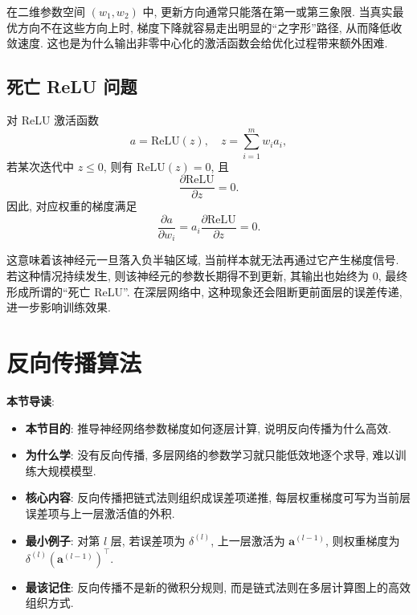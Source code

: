 \documentclass{../nndlcourse}
\begin{document}
在二维参数空间 $(w_1, w_2)$ 中, 更新方向通常只能落在第一或第三象限. 当真实最优方向不在这些方向上时, 梯度下降就容易走出明显的“之字形”路径, 从而降低收敛速度. 这也是为什么输出非零中心化的激活函数会给优化过程带来额外困难. 

\subsection{死亡 ReLU 问题}

对 ReLU 激活函数
\begin{equation*}
    a = \mathrm{ReLU}(z), \quad z = \sum_{i=1}^{m} w_i a_i,
\end{equation*}
若某次迭代中 $z \le 0$, 则有 $\mathrm{ReLU}(z) = 0$, 且
\begin{equation*}
    \frac{\partial \mathrm{ReLU}}{\partial z} = 0.
\end{equation*}
因此, 对应权重的梯度满足
\begin{equation*}
    \frac{\partial a}{\partial w_i} = a_i \frac{\partial \mathrm{ReLU}}{\partial z} = 0.
\end{equation*}

这意味着该神经元一旦落入负半轴区域, 当前样本就无法再通过它产生梯度信号. 若这种情况持续发生, 则该神经元的参数长期得不到更新, 其输出也始终为 0, 最终形成所谓的“死亡 ReLU”. 在深层网络中, 这种现象还会阻断更前面层的误差传递, 进一步影响训练效果. 

\section{反向传播算法}

\textbf{本节导读}:
\begin{itemize}
    \item \textbf{本节目的}: 推导神经网络参数梯度如何逐层计算, 说明反向传播为什么高效.
    \item \textbf{为什么学}: 没有反向传播, 多层网络的参数学习就只能低效地逐个求导, 难以训练大规模模型.
    \item \textbf{核心内容}: 反向传播把链式法则组织成误差项递推, 每层权重梯度可写为当前层误差项与上一层激活值的外积.
    \item \textbf{最小例子}: 对第 $l$ 层, 若误差项为 $\delta^{(l)}$, 上一层激活为 $\boldsymbol{a}^{(l-1)}$, 则权重梯度为 $\delta^{(l)}(\boldsymbol{a}^{(l-1)})^\top$.
    \item \textbf{最该记住}: 反向传播不是新的微积分规则, 而是链式法则在多层计算图上的高效组织方式.
\end{itemize}
\end{document}
